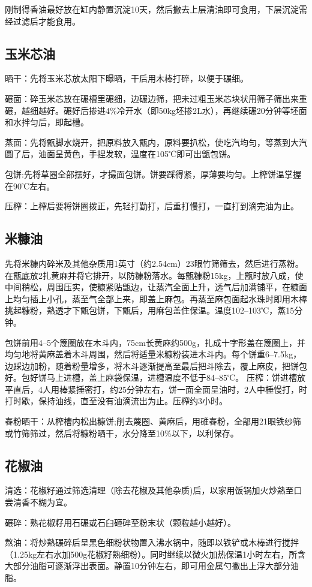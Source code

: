 \documentclass{ctexbook}
\begin{document}
刚制得香油最好放在缸内静置沉淀10天，然后撇去上层清油即可食用，下层沉淀需经过滤后才能食用。
\subsection{玉米芯油}
晒干：先将玉米芯放太阳下曝晒，干后用木棒打碎，以便于碾细。

碾面：碎玉米芯放在碾槽里碾细，边碾边筛，把未过粗玉米芯块状用筛子筛出来重碾，越细越好。碾好后掺进4\%冷开水（即50kg坯掺2L水），再继续碾20分钟等坯面和水拌匀后，即起槽。

蒸面：先将甑脚水烧开，把原料放入甑内，原料要扒松，使吃汽均匀，等蒸到大汽圆了后，油面呈黄色，手捏发软，温度在105℃即可出甑包饼。

包饼:先将草圈全部摆好，才撮面包饼。饼要踩得紧，厚薄要均匀。上榨饼温掌握在90℃左右。

压榨：上榨后要将饼圈拨正，先轻打勤打，后重打慢打，一直打到滴完油为止。
\subsection{米糠油}
先将米糠内碎米及其他杂质用1英寸（约2.54cm）23眼竹筛筛去，然后进行蒸粉。在甑底放2扎黄麻并将它排开，以防糠粉落水。每甑糠粉15kg，上甑时放八成，使中间稍松，周围压实，使糠紧贴甑边，让蒸汽全面上升，透气后加满铺平，在糠面上均匀插上小孔，蒸至气全部上来，即盖上麻包。再蒸至麻包面起水珠时即用木棒挑起糠粉，熟透才下甑包饼，下甑后，用麻包盖住保温。温度102--103℃，蒸15分钟。

包饼前用4--5个篾圈放在木斗内，75cm长黄麻约500g，扎成十字形盖在篾圈上，并均匀地将黄麻盖着木斗周围，然后将适量米糠粉装进木斗内。每个饼重6--7.5kg，边踩边加粉，随着粉量增多，将木斗逐渐提高至最后把斗除去，覆上麻皮，把饼包好。包好饼马上进槽，盖上麻袋保温，进槽温度不低于84--85℃。
压榨：饼进槽放平直后，4人用棒紧捶密打，约25分钟左右，饼一面全面呈油时，2人中棰慢打，时打时歇，保持油线，直至没有油滴流出为止。压榨约3小时。

舂粉晒干：从榨槽内松出糠饼;削去蔑圈、黄麻后，用碓舂粉，全部用21眼铁纱筛或竹筛筛过，然后将糠粉晒干，水分降至10\%以下，以利保存。
\subsection{花椒油}
清选：花椒籽通过筛选清理（除去花椒及其他杂质)后，以家用饭锅加火炒熟至口尝清香不糊为宜。

碾碎：熟花椒籽用石碾或石臼砸碎至粉末状（颗粒越小越好）。

熬油：将炒熟碾碎后呈黑色细粉状物置入沸水锅中，随即以铁铲或木棒进行搅拌（1.25kg左右水加500g花椒籽熟细粉）。同时继续以微火加热保温1小时左右，所含大部分油脂可逐渐浮出表面。静置10分钟左右，即可用金属勺撇出上浮大部分油脂。
\end{document}
